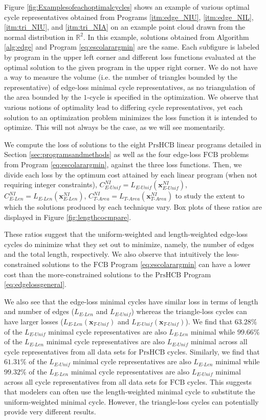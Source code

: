 \documentclass[utf8]{formatting_stuff/frontiersFPHY}
\newcommand{\R}{\mathbb{R}}
\newcommand{\optimalrep}{\mathbf{x}}
\newcommand{\se}{Section }
\newcommand{\fig}{Figure }
\newcommand{\NI}{^{NI}}
\newcommand{\setoffilteredcyclebases}{\mathrm{FCB}}
\newcommand{\setofpersistenthcyclebases}{\mathrm{PrsHCB}}
\newcommand{\pr}{Program }
\newcommand{\EU}{_{E\text{-}Unif}}
\newcommand{\EL}{_{E\text{-}Len}}
\newcommand{\TU}{_{T\text{-}Unif}}
\newcommand{\TA}{_{T\text{-}Area}}
\theoremstyle{plain}
\theoremstyle{definition}
\begin{document}
\fig \ref{fig:Examplesofeachoptimalcycles} shows an example of various optimal cycle representatives obtained from Programs
\ref{itm:edge_NIU},
\ref{itm:edge_NIL},
\ref{itm:tri_NIU}, and
\ref{itm:tri_NIA}
on an example point cloud drawn from the normal distribution in $\R^2$. In this example, solutions obtained from Algorithm \ref{alg:edge} and \pr \eqref{eq:escolarargmin} are the same. Each subfigure is labeled by program in the upper left corner and different loss functions evaluated at the optimal solution to the given program in the upper right corner. We do not have a way to measure the volume (i.e. the number of triangles bounded by the representative) of edge-loss minimal cycle representatives, as no triangulation of the area bounded by the $1$-cycle is specified in the optimization. We observe that various notions of optimality lead to differing cycle representatives, yet each solution to an optimization problem minimizes the loss function it is intended to optimize. This will not always be the case, as we will see momentarily.

We compute the loss of solutions to the eight $\setofpersistenthcyclebases$ linear programs detailed in \se \ref{sec:programsandmethods} as well as the four edge-loss $\setoffilteredcyclebases$ problems from \pr \eqref{eq:escolarargmin}, against the three loss functions. Then, we divide each loss by the optimum cost attained by each linear program (when not requiring integer constraints), $C\EU\NI=L\EU(\optimalrep\EU\NI)$, $C\EL\NI=L\EL(\optimalrep\EL\NI)$, $C\TA\NI=L\TA(\optimalrep\TA\NI)$ to study the extent to which the solutions produced by each technique vary.   
Box plots of these ratios are displayed in \fig\ref{fig:lengthcocmpare}. 




These ratios suggest that the uniform-weighted and length-weighted edge-loss cycles do minimize what they set out to minimize, namely, the number of edges and the total length, respectively. We also observe that intuitively the less-constrained solutions to the $\setoffilteredcyclebases$ \pr \eqref{eq:escolarargmin} can have a lower cost than the more-constrained solutions to the $\setofpersistenthcyclebases$ \pr \eqref{eq:edgelossgeneral}. 
 
We also see that the edge-loss minimal cycles have similar loss in terms of length and number of edges ($L\EL$ and $L\EU$) whereas the triangle-loss cycles can have larger losses ($L\EL(\optimalrep\TU)$ and $L\EU(\optimalrep\TU)$). We find that $63.28\%$ of the $L\EU$ minimal cycle representatives are also $L\EL$ minimal while $99.66\%$ of the $L\EL$ minimal cycle representatives are also $L\EU$ minimal across all cycle representatives from all data sets for $\setofpersistenthcyclebases$ cycles. Similarly, we find that $61.31\%$ of the $L\EU$ minimal cycle representatives are also $L\EL$ minimal while $99.32\%$ of the $L\EL$ minimal cycle representatives are also $L\EU$ minimal across all cycle representatives from all data sets for $\setoffilteredcyclebases$ cycles. This suggests that modelers can often use the length-weighted minimal cycle to substitute the uniform-weighted minimal cycle. However, the triangle-loss cycles can potentially provide very different results. 
\end{document}
